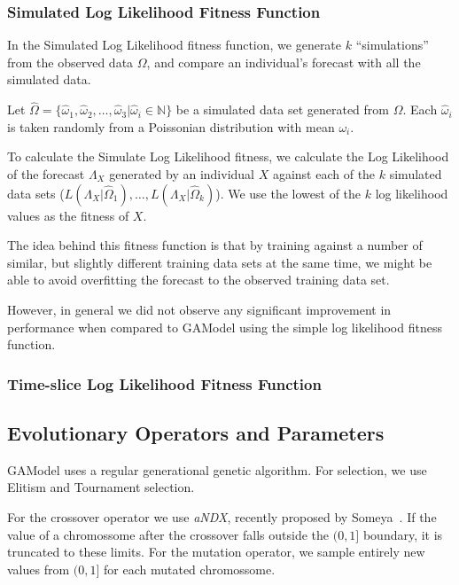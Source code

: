 \documentclass{sig-alternate}
\begin{document}
\subsubsection{Simulated Log Likelihood Fitness Function}

In the Simulated Log Likelihood fitness function, we generate $k$
``simulations'' from the observed data $\Omega$, and compare an
individual's forecast with all the simulated data.

Let $\hat\Omega =
\{\hat\omega_1,\hat\omega_2,\dots,\hat\omega_3
|\hat\omega_i\in\mathbb{N}\}$ be a simulated data set generated from
$\Omega$. Each $\hat\omega_i$ is taken randomly from a Poissonian
distribution with mean $\omega_i$.

To calculate the Simulate Log Likelihood fitness, we calculate the Log
Likelihood of the forecast $\Lambda_X$ generated by an individual $X$
against each of the $k$ simulated data sets
($L(\Lambda_X|\hat\Omega_1), \dots, L(\Lambda_X|\hat\Omega_k)$). We
use the lowest of the $k$ log likelihood values as the fitness of $X$.

The idea behind this fitness function is that by training against a
number of similar, but slightly different training data sets at the
same time, we might be able to avoid overfitting the forecast to the
observed training data set.

However, in general we did not observe any significant improvement in
performance when compared to GAModel using the simple log likelihood
fitness function.


\subsubsection{Time-slice Log Likelihood Fitness Function}


\subsection{Evolutionary Operators and Parameters}

GAModel uses a regular generational genetic algorithm. For selection,
we use Elitism and Tournament selection. 

For the crossover operator we use \emph{aNDX}, recently proposed by
Someya~\cite{Someya2013}. If the value of a chromossome after the
crossover falls outside the $(0,1]$ boundary, it is truncated to these
  limits. For the mutation operator, we sample entirely new values
  from $(0,1]$ for each mutated chromossome.
\end{document}
